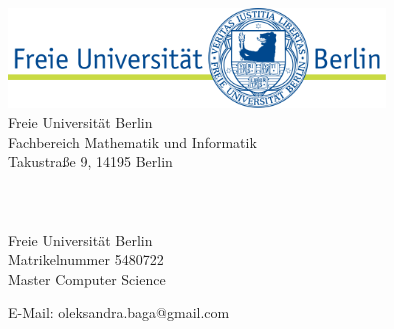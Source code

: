 \begin{titlepage}
	\tgherosfont
	\centering

	\includegraphics[width=10cm]{gfx/fu_logo} \\[12mm]



    {\normalsize Freie Universität Berlin}\\
    {\normalsize Fachbereich Mathematik und Informatik}\\
    {\normalsize Takustraße 9, 14195 Berlin}\\[10mm]
	\hspace*{25pt}
	{\LARGE \color{ctcolortitle}\textbf{\thesisTitle}}\\[5mm]
	{\color{ctcolortitle}\textbf{\thesisTitleEng}}\\[40mm]


	
	{\LARGE \thesisName} \\[5mm]
	    {\normalsize Freie Universität Berlin} \\
	    \hspace*{15pt}
    {\normalsize Matrikelnummer 5480722} \\
	{\normalsize Master Computer Science} \\
	\hspace*{50pt}


	{\small E-Mail: oleksandra.baga@gmail.com} \\
	\hspace*{200pt}

	\vfill
	
	\hspace*{15pt}
	\begin{minipage}[t]{.65\textwidth}
		\centering
		{\large \thesisFirstReviewer} \\
	  	{\small \thesisFirstReviewerDepartment} \\[-1mm]
		{\small \thesisFirstReviewerUniversity}
			\hspace*{15pt}
	\end{minipage} \\[15mm]

\hspace*{15pt}
\begin{minipage}[t]{.65\textwidth}
	\centering
	{\large \thesisSecondReviewer} \\
	{\small \thesisSecondReviewerDepartment} \\[-1mm]
	{\small \thesisSecondReviewerUniversity}
	
\end{minipage} \\[5mm]

\end{titlepage}